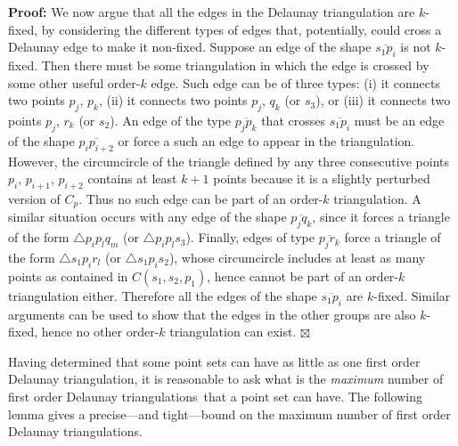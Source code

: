 \documentclass {journal}
\newenvironment {proof}{\textbf {Proof:}}{\hfill \ensuremath {\boxtimes}}
\newcommand {\fodt}{first order Delaunay triangulation}
\newcommand {\fodts}{first order Delaunay triangulations}
\begin{document}
\begin{proof}
We now argue that all the edges in the Delaunay triangulation are
$k$-fixed, by considering the different types of edges that,
potentially, could cross a Delaunay edge to make it non-fixed.
Suppose an edge of the shape $\overline{s_1 p_i}$ is not
$k$-fixed. Then there must be some triangulation in which the edge
is crossed by some other useful order-$k$ edge. Such edge can be
of three types: (i) it connects two points $p_j$, $p_k$, (ii) it
connects two points $p_j$, $q_k$ (or $s_3$), or (iii) it connects
two points $p_j$, $r_k$ (or $s_2$). An edge of the type
$\overline{p_j p_k}$ that crosses $\overline{s_1 p_i}$ must be an
edge of the shape $\overline{p_ip_{i+2}}$ or force a such an edge
to appear in the triangulation. However, the circumcircle of the
triangle defined by any three consecutive points $p_i$, $p_{i+1}$,
$p_{i+2}$ contains at least $k+1$ points because it is a slightly
perturbed version of $C_p$. Thus no such edge can be part of an
order-$k$ triangulation. A similar situation occurs with any edge
of the shape $\overline{p_j q_k}$, since it forces a triangle of
the form $\triangle p_ip_lq_m$ (or $\triangle p_ip_ls_3$).
Finally, edges of type $\overline{p_j r_k}$ force a triangle of
the form $\triangle s_1p_ir_l$ (or $\triangle s_1p_is_2$), whose
circumcircle includes at least as many points as contained in
$C(s_1,s_2,p_1)$, hence cannot be part of an order-$k$
triangulation either. Therefore all the edges of the shape
$\overline{s_1 p_i}$ are $k$-fixed. Similar arguments can be used
to show that the edges in the other groups are also $k$-fixed,
hence no other order-$k$ triangulation can exist.
\end{proof}


Having determined that some point sets can have as little as one \fodt, it is reasonable to ask what is the \emph{maximum} number of \fodts\ that a point set can have.
The following lemma gives a precise---and tight---bound on the maximum number of \fodts.
\end{document}

